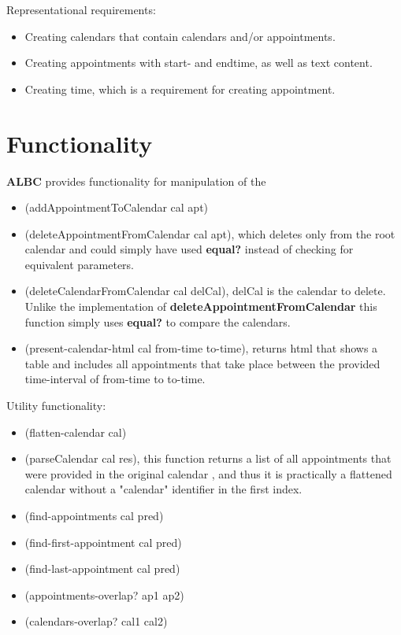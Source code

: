 \documentclass{IOS-Book-Article}
\begin{document}
Representational requirements:
\begin{itemize}
\item Creating calendars that contain calendars and/or appointments.
\item Creating appointments with start- and endtime, as well as text content.
\item Creating time, which is a requirement for creating appointment.
\end{itemize}

\section{Functionality} \label{sec:functionality}

\textbf{ALBC} provides functionality for manipulation of the 

\begin{itemize}
\item (addAppointmentToCalendar cal apt)
\item (deleteAppointmentFromCalendar cal apt), which deletes only from the root calendar and could simply have used \textbf{equal?} instead of checking for equivalent parameters. 
\item (deleteCalendarFromCalendar cal delCal), delCal is the calendar to delete. Unlike the implementation of \textbf{deleteAppointmentFromCalendar} this function simply uses \textbf{equal?} to compare the calendars.
\item (present-calendar-html cal from-time to-time), returns html that shows a table and includes all appointments that take place between the provided time-interval of from-time to to-time.
\end{itemize}

Utility functionality:
\begin{itemize}
\item (flatten-calendar cal)
\item (parseCalendar cal res), this function returns a list of all appointments that were provided in the original calendar , and thus it is practically a flattened calendar without a "calendar" identifier in the first index. 
\item (find-appointments cal pred)
\item (find-first-appointment cal pred)
\item (find-last-appointment cal pred)
\item (appointments-overlap? ap1 ap2)
\item (calendars-overlap? cal1 cal2)
\end{itemize}
\end{document}
